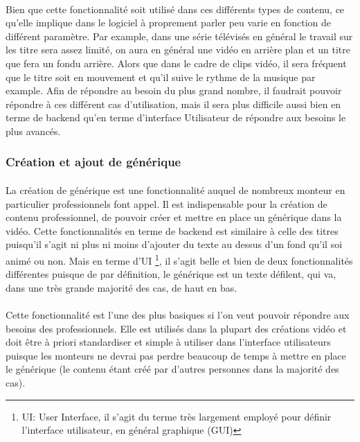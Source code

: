       \paragraph{}
        Bien que cette fonctionnalité soit utilisé dans ces différents types de contenu,
        ce qu'elle implique dans le logiciel à proprement parler peu varie en fonction
        de différent paramètre. Par example, dans une série télévisés en général le
        travail sur les titre sera assez limité, on aura en général une vidéo en arrière
        plan et un titre que fera un fondu arrière. Alors que dans le cadre de clips vidéo,
        il sera fréquent que le titre soit en mouvement et qu'il suive le rythme de la
        musique par example. Afin de répondre au besoin du plus grand nombre, il faudrait
        pouvoir répondre à ces différent cas d'utilisation, mais il sera plus difficile
        aussi bien en terme de backend qu'en terme d'interface Utilisateur de répondre
        aux besoins le plus avancés.

    \subsubsection{Création et ajout de générique}
      \paragraph{}
        La création de générique est une fonctionnalité auquel de
        nombreux monteur en particulier professionnels font appel. Il est
        indispensable  pour la création de contenu professionnel, de pouvoir
        créer et mettre en place un générique dans la vidéo. Cette
        fonctionnalités en terme de backend est similaire à
        celle des titres puisqu'il s'agit ni plus ni moins d'ajouter du
        texte au dessus d'un fond qu'il soi animé ou non. Mais en terme d'UI
        \footnote{ UI: User Interface, il s'agit du terme  très largement
        employé pour définir l'interface utilisateur, en général graphique (GUI)},
        il s'agit belle et bien de deux fonctionnalités différentes puisque de par
        définition, le générique est un texte défilent, qui va, dans une très grande
        majorité des cas, de haut en bas.

      \paragraph{}
        Cette fonctionnalité est l'une des plus basiques si
        l'on veut pouvoir répondre aux besoins des professionnels. Elle est utilisés
        dans la plupart des créations vidéo et doit être à priori standardiser et
        simple à utiliser dans l'interface utilisateurs puisque les monteurs ne devrai
        pas perdre beaucoup de temps à mettre en place le générique (le contenu étant
        créé par d'autres personnes dans la majorité des cas).

